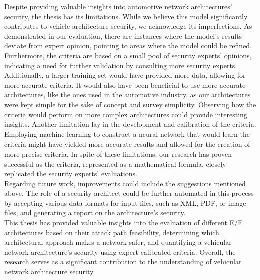 Despite providing valuable insights into automotive network architectures' security, the thesis has its limitations.
While we believe this model significantly contributes to vehicle architecture security, we acknowledge its imperfections. 
As demonstrated in our evaluation, there are instances where the model's results deviate from expert opinion, 
pointing to areas where the model could be refined.
Furthermore, the criteria are based on a small pool of security experts' opinions, 
indicating a need for further validation by consulting more security experts. 
Additionally, a larger training set would have provided more data, allowing for more accurate criteria. 
It would also have been beneficial to use more accurate architectures, like the ones used in the automotive industry, 
as our architectures were kept simple for the sake of concept and survey simplicity. 
Observing how the criteria would perform on more complex architectures could provide interesting insights.
Another limitation lay in the development and calibration of the criteria. 
Employing machine learning to construct a neural network that would learn the criteria might have 
yielded more accurate results and allowed for the creation of more precise criteria.
In spite of these limitations, our research has proven successful as the criteria, 
represented as a mathematical formula, closely replicated the security experts' evaluations.\\

Regarding future work, improvements could include the suggestions mentioned above. 
The role of a security architect could be further automated in this process by accepting various data formats for input files, 
such as XML, PDF, or image files, and generating a report on the architecture's security.\\

This thesis has provided valuable insights into the evaluation of different E/E architectures based on their attack path feasibility, 
determining which architectural approach makes a network safer, and quantifying a vehicular network architecture's security using expert-calibrated criteria.
Overall, the research serves as a significant contribution to the understanding of vehicular network architecture security.